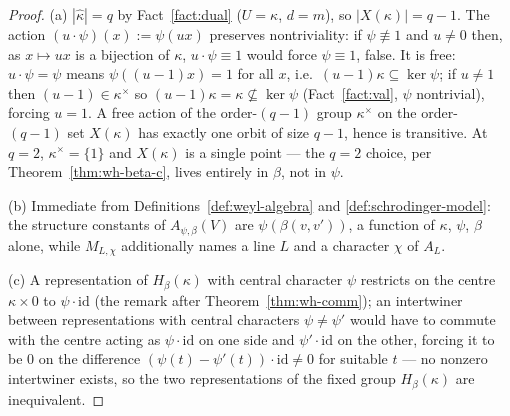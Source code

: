 
\begin{proof}
(a) $|\hat\kappa|=q$ by Fact~\ref{fact:dual} ($U=\kappa$, $d=m$), so
$|X(\kappa)|=q-1$. The action $(u\cdot\psi)(x):=\psi(ux)$ preserves
nontriviality: if $\psi\not\equiv 1$ and $u\neq 0$ then, as $x\mapsto ux$ is
a bijection of $\kappa$, $u\cdot\psi\equiv 1$ would force $\psi\equiv 1$,
false. It is free: $u\cdot\psi=\psi$ means $\psi((u-1)x)=1$ for all $x$,
i.e.\ $(u-1)\kappa\subseteq\ker\psi$; if $u\neq 1$ then $(u-1)\in\kappa^\times$
so $(u-1)\kappa=\kappa\not\subseteq\ker\psi$ (Fact~\ref{fact:val}, $\psi$
nontrivial), forcing $u=1$. A free action of the order-$(q-1)$ group
$\kappa^\times$ on the order-$(q-1)$ set $X(\kappa)$ has exactly one orbit
of size $q-1$, hence is transitive. At $q=2$, $\kappa^\times=\{1\}$ and
$X(\kappa)$ is a single point — the $q=2$ choice, per
Theorem~\ref{thm:wh-beta-c}, lives entirely in $\beta$, not in $\psi$.

(b) Immediate from Definitions~\ref{def:weyl-algebra} and
\ref{def:schrodinger-model}: the structure constants of $A_{\psi,\beta}(V)$
are $\psi(\beta(v,v'))$, a function of $\kappa$, $\psi$, $\beta$ alone, while
$M_{L,\chi}$ additionally names a line $L$ and a character $\chi$ of $A_L$.

(c) A representation of $H_\beta(\kappa)$ with central character $\psi$
restricts on the centre $\kappa\times 0$ to $\psi\cdot\mathrm{id}$ (the
remark after Theorem~\ref{thm:wh-comm}); an intertwiner between
representations with central characters $\psi\neq\psi'$ would have to
commute with the centre acting as $\psi\cdot\mathrm{id}$ on one side and
$\psi'\cdot\mathrm{id}$ on the other, forcing it to be $0$ on the difference
$(\psi(t)-\psi'(t))\cdot\mathrm{id}\neq 0$ for suitable $t$ — no nonzero
intertwiner exists, so the two representations of the fixed group
$H_\beta(\kappa)$ are inequivalent.


\end{proof}

